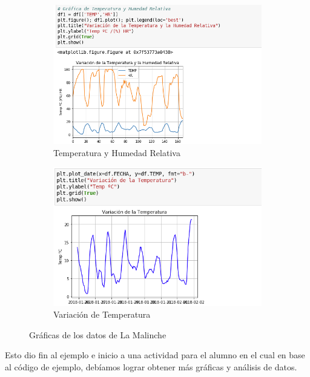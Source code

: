\documentclass[a4paper]{article}
\begin{document}
\begin{figure}[h!]
  \centering
  \begin{subfigure}[b]{0.3\linewidth}
    \includegraphics[width=\linewidth]{grafica2.png}
    \caption{Temperatura y Humedad Relativa}
  \end{subfigure}
  \begin{subfigure}[b]{0.3\linewidth}
    \includegraphics[width=\linewidth]{grafica3.png}
    \caption{Variación de Temperatura}
  \end{subfigure}
  \caption{Gráficas de los datos de La Malinche}
\end{figure}

Esto dio fin al ejemplo e inicio a una actividad para el alumno en el cual en base al código de ejemplo, debíamos lograr obtener más gráficas y análisis de datos.
\end{document}
